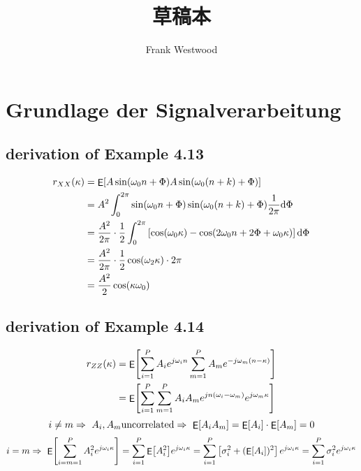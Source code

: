\documentclass[nochapterpage,bigchapter,linedtoc,longdoc,colorback,accentcolor=tud2c]{tudreport}
\title{\textbf{草稿本}}
\subtitle{Frank Westwood}
\DeclareMathOperator{\expectation}{\mathsf{E}}
\DeclarePairedDelimiter\eckigeklammer{[}{]}
\newcommand{\expect}[1]{\expectation \eckigeklammer*{#1}}
\begin{document}
\maketitle
 

\tableofcontents


  \chapter{Grundlage der Signalverarbeitung}
\section{derivation of Example 4.13}
\begin{equation*}
	\begin{aligned}
		r_{XX}(\kappa) &= \expect{A \sin(\omega_0n +\Phi) A \sin(\omega_0(n+k) + \Phi)} \\
		&= A^2 \int_{0}^{2\pi} \sin(\omega_0 n + \Phi) \sin(\omega_0(n+k) + \Phi ) \frac{1}{2\pi} \mathrm{d} \Phi \\
		&= \frac{A^2}{2\pi} \cdot \frac{1}{2} \int_{0}^{2\pi} \left[ \cos(\omega_0 \kappa) - \cos(2\omega_0 n + 2\Phi + \omega_0 \kappa ) \right] \mathrm{d} \Phi \\
		&= \frac{A^2}{2\pi} \cdot \frac{1}{2} \cos(\omega_2 \kappa) \cdot 2\pi \\
		&= \frac{A^2}{2} \cos(\kappa \omega_0)
 	\end{aligned}
\end{equation*}

\section{derivation of Example 4.14}
\begin{equation*}
	\begin{aligned}
		r_{ZZ}(\kappa ) &= \expect{\sum_{i=1}^{P} A_i e^{j \omega_i n } \sum_{m=1}^{P} A_m e^{-j \omega_m(n-\kappa) }} \\
		&= \expect{\sum_{i=1}^P \sum_{m=1}^P A_i A_m e^{jn(\omega_i - \omega_m)} e^{j\omega_m \kappa}} \\
	\end{aligned}
\end{equation*}
\begin{equation*}
	i \neq m \Rightarrow \ A_i,A_m \text{uncorrelated} \Rightarrow \ \expect{A_iA_m} = \expect{A_i}\cdot \expect{A_m} =0 \\
\end{equation*}
\begin{equation*}
	i = m \Rightarrow \  \expect{\sum_{i=m=1}^{P} A_i^2 e^{j \omega_i \kappa}} =\sum_{i=1}^P \expect{A_i^2} e^{j\omega_i \kappa} = \sum_{i=1}^{P}\left[ \sigma_i^2 +(\expect{A_i} )^2 \right] e^{j\omega_i \kappa} = \sum_{i=1}^P \sigma_i^2 e^{j\omega_i \kappa } \\	
\end{equation*}
\end{document}
